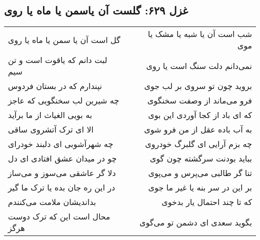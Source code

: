 \begin{center}
\section*{غزل ۶۲۹: گلست آن یاسمن یا ماه یا روی}
\label{sec:629}
\begin{longtable}{l p{0.5cm} r}
گل است آن یا سمن یا ماه یا روی
&&
شب است آن یا شبه یا مشک یا موی 
\\
لبت دانم که یاقوت است و تن سیم
&&
نمی‌دانم دلت سنگ است یا روی
\\
نپندارم که در بستان فردوس
&&
بروید چون تو سروی بر لب جوی
\\
چه شیرین لب سخنگویی که عاجز
&&
فرو می‌ماند از وصفت سخنگوی
\\
به بویی الغیاث از ما برآید
&&
که ای باد از کجا آوردی این بوی
\\
الا ای ترک آتشروی ساقی
&&
به آب باده عقل از من فرو شوی
\\
چه شهرآشوبی ای دلبند خودرای
&&
چه بزم آرایی ای گلبرگ خودروی
\\
چو در میدان عشق افتادی ای دل
&&
بباید بودنت سرگشته چون گوی
\\
دلا گر عاشقی می‌سوز و می‌ساز
&&
تنا گر طالبی می‌پرس و می‌پوی
\\
در این ره جان بده یا ترک ما گیر
&&
بر این در سر بنه یا غیر ما جوی
\\
بداندیشان ملامت می‌کنندم
&&
که تا چند احتمال یار بدخوی
\\
محال است این که ترک دوست هرگز
&&
بگوید سعدی ای دشمن تو می‌گوی
\\
\end{longtable}
\end{center}
